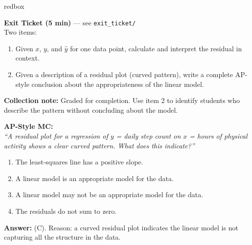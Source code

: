 \documentclass[10pt]{article}
\begin{document}
\begin{skillbox}{redbox}
\begin{minipage}[t]{0.48\linewidth}
    \textbf{Exit Ticket (5 min)} --- see \texttt{exit\_ticket/}\\
    Two items:
    \begin{enumerate}
        \item Given $x$, $y$, and $\hat{y}$ for one data point, calculate and interpret
              the residual in context.
        \item Given a description of a residual plot (curved pattern), write a complete
              AP-style conclusion about the appropriateness of the linear model.
    \end{enumerate}
    \textbf{Collection note:} Graded for completion. Use item 2 to identify students who
    describe the pattern without concluding about the model.
\end{minipage}
\hfill
\begin{minipage}[t]{0.48\linewidth}
    \textbf{AP-Style MC:}\\
    \small\textit{``A residual plot for a regression of $y$ = daily step count on $x$ = hours
    of physical activity shows a clear curved pattern. What does this indicate?''}
    \begin{enumerate}[label=(\Alph*)]
        \item The least-squares line has a positive slope.
        \item A linear model is an appropriate model for the data.
        \item A linear model may not be an appropriate model for the data.
        \item The residuals do not sum to zero.
    \end{enumerate}
    \textbf{Answer:} (C). Reason: a curved residual plot indicates the linear model is not
    capturing all the structure in the data.
\end{minipage}
\end{skillbox}
\end{document}
